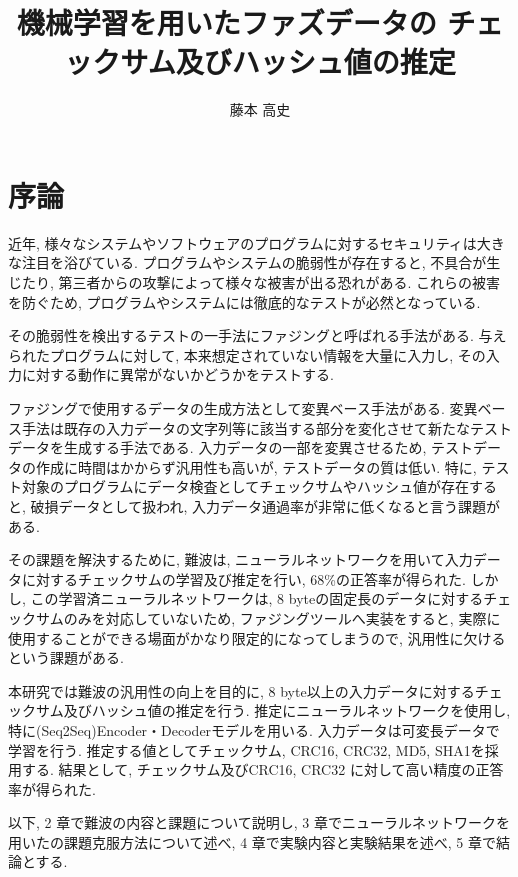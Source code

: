 \documentclass[11pt]{jbook}
\author{藤本 高史} %
\title{機械学習を用いたファズデータの \PAR チェックサム及びハッシュ値の推定} %
\begin{document}
\coverpage

\tableofcontents

\body

\chapter{序論}

近年, 様々なシステムやソフトウェアのプログラムに対するセキュリティは大きな注目を浴びている. プログラムやシステムの脆弱性が存在すると, 不具合が生じたり, 第三者からの攻撃によって様々な被害が出る恐れがある. これらの被害を防ぐため, プログラムやシステムには徹底的なテストが必然となっている.

その脆弱性を検出するテストの一手法にファジングと呼ばれる手法がある. 与えられたプログラムに対して, 本来想定されていない情報を大量に入力し, その入力に対する動作に異常がないかどうかをテストする.

ファジングで使用するデータの生成方法として変異ベース手法がある. 変異ベース手法は既存の入力データの文字列等に該当する部分を変化させて新たなテストデータを生成する手法である. 入力データの一部を変異させるため, テストデータの作成に時間はかからず汎用性も高いが, テストデータの質は低い. 特に, テスト対象のプログラムにデータ検査としてチェックサムやハッシュ値が存在すると, 破損データとして扱われ, 入力データ通過率が非常に低くなると言う課題がある.

その課題を解決するために, 難波\cite{namba}は, ニューラルネットワークを用いて入力データに対するチェックサムの学習及び推定を行い, 68\%の正答率が得られた. しかし, この学習済ニューラルネットワークは, 8 byteの固定長のデータに対するチェックサムのみを対応していないため, ファジングツールへ実装をすると, 実際に使用することができる場面がかなり限定的になってしまうので, 汎用性に欠けるという課題がある.

本研究では難波\cite{namba}の汎用性の向上を目的に, 8 byte以上の入力データに対するチェックサム及びハッシュ値の推定を行う.
推定にニューラルネットワークを使用し, 特に(Seq2Seq)Encoder・Decoderモデル\cite{seq2seq}を用いる.
入力データは可変長データで学習を行う.
推定する値としてチェックサム, CRC16\cite{crc}, CRC32\cite{crc}, MD5\cite{md5}, SHA1\cite{sha1}を採用する.
結果として, チェックサム及びCRC16\cite{crc}, CRC32\cite{crc} に対して高い精度の正答率が得られた.

以下, 2 章で難波\cite{namba}の内容と課題について説明し, 3 章でニューラルネットワークを用いたの課題克服方法について述べ, 4 章で実験内容と実験結果を述べ, 5 章で結論とする.
\end{document}
